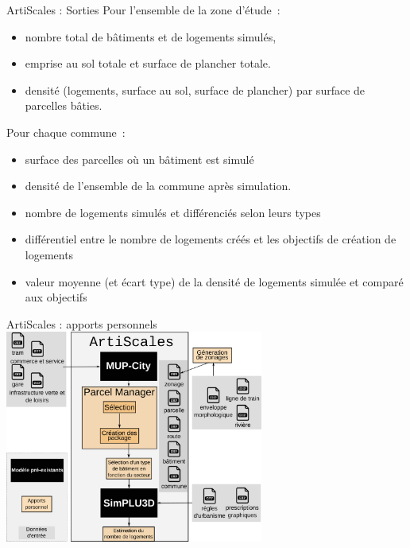 \documentclass[xcolor=table]{beamer}
\begin{document}
\begin{frame}{ArtiScales : Sorties}
Pour l'ensemble de la zone d'étude~:
\begin{itemize}
	\footnotesize
	\item nombre total de bâtiments et de logements simulés, %
	\item emprise au sol totale et surface de plancher totale.
	\item densité (logements, surface au sol, surface de plancher) par surface de parcelles bâties.
\end{itemize}
Pour chaque commune~:
\begin{itemize}
	\item surface des parcelles où un bâtiment est simulé
	\item densité de l'ensemble de la commune après simulation.
	\item nombre de logements simulés et différenciés selon leurs types
	\item différentiel entre le nombre de logements créés et les objectifs de création de logements
	\item valeur moyenne (et écart type) de la densité de logements simulée et comparé aux objectifs
\end{itemize}
\end{frame}

\begin{frame}{ArtiScales : apports personnels}
		\includegraphics[width=8.5cm]{Images/schemGen-prez-apports.png}
\end{frame}
\end{document}
